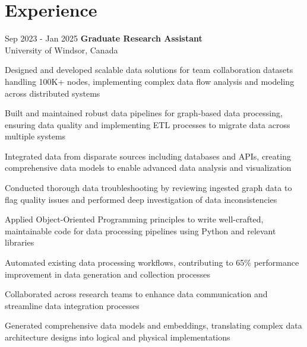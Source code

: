 \section{Experience}
    \begin{twocolentry}{
        Sep 2023 - Jan 2025
    }
        \textbf{Graduate Research Assistant} \\ University of Windsor, Canada\end{twocolentry}

    \vspace{0.10 cm}
    \begin{onecolentry}
        \begin{highlights}
            \item Designed and developed scalable data solutions for team collaboration datasets handling 100K+ nodes, implementing complex data flow analysis and modeling across distributed systems
            \item Built and maintained robust data pipelines for graph-based data processing, ensuring data quality and implementing ETL processes to migrate data across multiple systems
            \item Integrated data from disparate sources including databases and APIs, creating comprehensive data models to enable advanced data analysis and visualization
            \item Conducted thorough data troubleshooting by reviewing ingested graph data to flag quality issues and performed deep investigation of data inconsistencies
            \item Applied Object-Oriented Programming principles to write well-crafted, maintainable code for data processing pipelines using Python and relevant libraries
            \item Automated existing data processing workflows, contributing to 65\% performance improvement in data generation and collection processes
            \item Collaborated across research teams to enhance data communication and streamline data integration processes
            \item Generated comprehensive data models and embeddings, translating complex data architecture designs into logical and physical implementations
        \end{highlights}
    \end{onecolentry}


    \vspace{0.2 cm}

